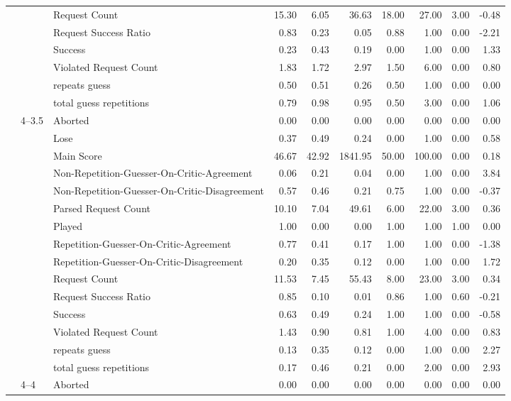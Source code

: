 \begin{tabular}{lllrrrrrrr}
 &  & Request Count & 15.30 & 6.05 & 36.63 & 18.00 & 27.00 & 3.00 & -0.48 \\
 &  & Request Success Ratio & 0.83 & 0.23 & 0.05 & 0.88 & 1.00 & 0.00 & -2.21 \\
 &  & Success & 0.23 & 0.43 & 0.19 & 0.00 & 1.00 & 0.00 & 1.33 \\
 &  & Violated Request Count & 1.83 & 1.72 & 2.97 & 1.50 & 6.00 & 0.00 & 0.80 \\
 &  & repeats guess & 0.50 & 0.51 & 0.26 & 0.50 & 1.00 & 0.00 & 0.00 \\
 &  & total guess repetitions & 0.79 & 0.98 & 0.95 & 0.50 & 3.00 & 0.00 & 1.06 \\
\cline{2-10}
 & \multirow[t]{15}{*}{4--3.5} & Aborted & 0.00 & 0.00 & 0.00 & 0.00 & 0.00 & 0.00 & 0.00 \\
 &  & Lose & 0.37 & 0.49 & 0.24 & 0.00 & 1.00 & 0.00 & 0.58 \\
 &  & Main Score & 46.67 & 42.92 & 1841.95 & 50.00 & 100.00 & 0.00 & 0.18 \\
 &  & Non-Repetition-Guesser-On-Critic-Agreement & 0.06 & 0.21 & 0.04 & 0.00 & 1.00 & 0.00 & 3.84 \\
 &  & Non-Repetition-Guesser-On-Critic-Disagreement & 0.57 & 0.46 & 0.21 & 0.75 & 1.00 & 0.00 & -0.37 \\
 &  & Parsed Request Count & 10.10 & 7.04 & 49.61 & 6.00 & 22.00 & 3.00 & 0.36 \\
 &  & Played & 1.00 & 0.00 & 0.00 & 1.00 & 1.00 & 1.00 & 0.00 \\
 &  & Repetition-Guesser-On-Critic-Agreement & 0.77 & 0.41 & 0.17 & 1.00 & 1.00 & 0.00 & -1.38 \\
 &  & Repetition-Guesser-On-Critic-Disagreement & 0.20 & 0.35 & 0.12 & 0.00 & 1.00 & 0.00 & 1.72 \\
 &  & Request Count & 11.53 & 7.45 & 55.43 & 8.00 & 23.00 & 3.00 & 0.34 \\
 &  & Request Success Ratio & 0.85 & 0.10 & 0.01 & 0.86 & 1.00 & 0.60 & -0.21 \\
 &  & Success & 0.63 & 0.49 & 0.24 & 1.00 & 1.00 & 0.00 & -0.58 \\
 &  & Violated Request Count & 1.43 & 0.90 & 0.81 & 1.00 & 4.00 & 0.00 & 0.83 \\
 &  & repeats guess & 0.13 & 0.35 & 0.12 & 0.00 & 1.00 & 0.00 & 2.27 \\
 &  & total guess repetitions & 0.17 & 0.46 & 0.21 & 0.00 & 2.00 & 0.00 & 2.93 \\
\cline{2-10}
 & \multirow[t]{15}{*}{4--4} & Aborted & 0.00 & 0.00 & 0.00 & 0.00 & 0.00 & 0.00 & 0.00 \\

\end{tabular}
